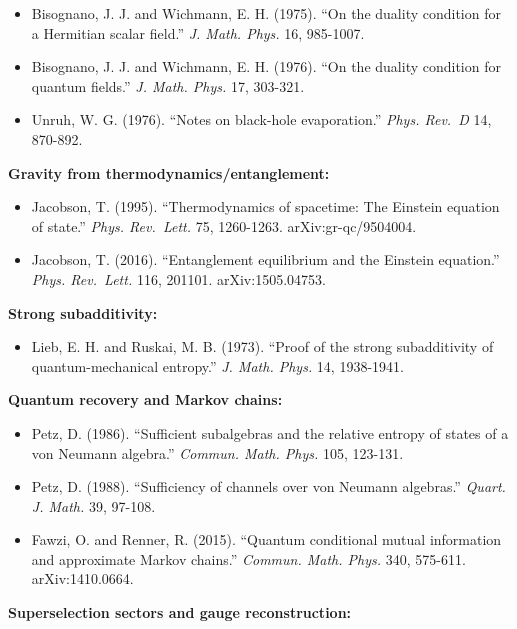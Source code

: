 \documentclass[
]{article}
\providecommand{\tightlist}{%
  \setlength{\itemsep}{0pt}\setlength{\parskip}{0pt}}
\begin{document}
\begin{itemize}
\tightlist
\item
  Bisognano, J. J. and Wichmann, E. H. (1975). ``On the duality
  condition for a Hermitian scalar field.'' \emph{J. Math. Phys.} 16,
  985-1007.
\item
  Bisognano, J. J. and Wichmann, E. H. (1976). ``On the duality
  condition for quantum fields.'' \emph{J. Math. Phys.} 17, 303-321.
\item
  Unruh, W. G. (1976). ``Notes on black-hole evaporation.'' \emph{Phys.
  Rev.~D} 14, 870-892.
\end{itemize}

\textbf{Gravity from thermodynamics/entanglement:}

\begin{itemize}
\tightlist
\item
  Jacobson, T. (1995). ``Thermodynamics of spacetime: The Einstein
  equation of state.'' \emph{Phys. Rev.~Lett.} 75, 1260-1263.
  arXiv:gr-qc/9504004.
\item
  Jacobson, T. (2016). ``Entanglement equilibrium and the Einstein
  equation.'' \emph{Phys. Rev.~Lett.} 116, 201101. arXiv:1505.04753.
\end{itemize}

\textbf{Strong subadditivity:}

\begin{itemize}
\tightlist
\item
  Lieb, E. H. and Ruskai, M. B. (1973). ``Proof of the strong
  subadditivity of quantum-mechanical entropy.'' \emph{J. Math. Phys.}
  14, 1938-1941.
\end{itemize}

\textbf{Quantum recovery and Markov chains:}

\begin{itemize}
\tightlist
\item
  Petz, D. (1986). ``Sufficient subalgebras and the relative entropy of
  states of a von Neumann algebra.'' \emph{Commun. Math. Phys.} 105,
  123-131.
\item
  Petz, D. (1988). ``Sufficiency of channels over von Neumann
  algebras.'' \emph{Quart. J. Math.} 39, 97-108.
\item
  Fawzi, O. and Renner, R. (2015). ``Quantum conditional mutual
  information and approximate Markov chains.'' \emph{Commun. Math.
  Phys.} 340, 575-611. arXiv:1410.0664.
\end{itemize}

\textbf{Superselection sectors and gauge reconstruction:}
\end{document}

